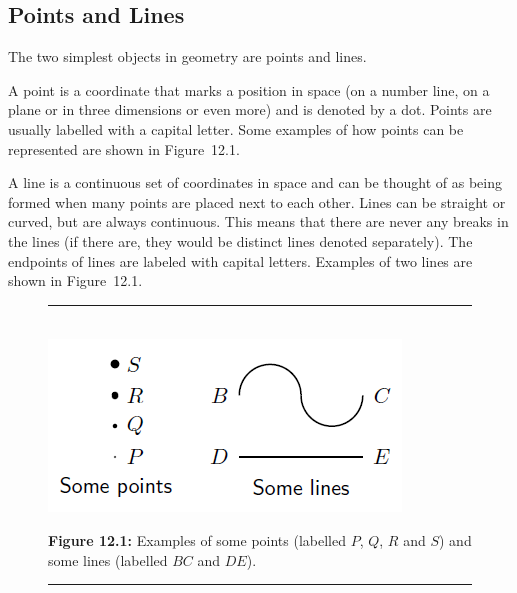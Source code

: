 \subsection{ Points and Lines}
\nopagebreak
The two simplest objects in geometry are points and lines.\par 
A point is a coordinate that marks a position in space (on a number line, on a plane or in three dimensions or even more) and is denoted by a dot. Points are usually labelled with a capital letter. Some examples of how points can be represented are shown in Figure~12.1.\par 
A line is a continuous set of coordinates in space and can be thought of as being formed when many points are placed next to each other. Lines can be straight or curved, but are always continuous. This means that there are never any breaks in the lines (if there are, they would be distinct lines denoted separately). The endpoints of lines are labeled with capital letters. Examples of two lines are shown in Figure~12.1.\par 
\setcounter{subfigure}{0}
\begin{figure}[H] %
\begin{center}
\rule[.1in]{\figurerulewidth}{.005in} \\
\label{m39370*uid7!!!underscore!!!media}\label{m39370*uid7!!!underscore!!!printimage}\includegraphics{col11306.imgs/m39370_MG10C13_001.png} %
\vspace{2pt}
\vspace{\rubberspace}\par \begin{cnxcaption}
\small \textbf{Figure 12.1: }Examples of some points (labelled $P$, $Q$, $R$ and $S$) and some lines (labelled $BC$ and $DE$).
\end{cnxcaption}
\vspace{.1in}
\rule[.1in]{\figurerulewidth}{.005in} \\
\end{center}
\end{figure}       
